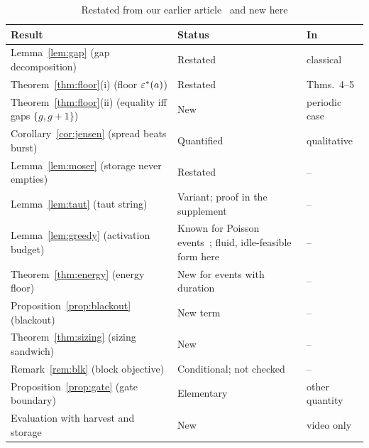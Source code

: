 \begin{table}[!t]\centering
\caption{Restated from our earlier article~\cite{deep3_jiot2026} and new here}\label{tab:new}
\footnotesize\setlength{\tabcolsep}{3pt}
\begin{tabular}{@{}>{\raggedright\arraybackslash}p{}>{\raggedright\arraybackslash}p{}>{\raggedright\arraybackslash}p{}@{}}\toprule
Result & Status & In~\cite{deep3_jiot2026}\\\midrule
Lemma~\ref{lem:gap} (gap decomposition) & Restated & classical\\
Theorem~\ref{thm:floor}(i) (floor $\varepsilon^*(a)$) & Restated & Thms.~4--5\\
Theorem~\ref{thm:floor}(ii) (equality iff gaps $\{g,g+1\}$) & New & periodic case\\
Corollary~\ref{cor:jensen} (spread beats burst) & Quantified & qualitative\\
Lemma~\ref{lem:moser} (storage never empties) & Restated & --\\
Lemma~\ref{lem:taut} (taut string) & Variant; proof in the supplement & --\\
Lemma~\ref{lem:greedy} (activation budget) & Known for Poisson events~\cite{ren2015p2p}; fluid, idle-feasible form here & --\\
Theorem~\ref{thm:energy} (energy floor) & New for events with duration & --\\
Proposition~\ref{prop:blackout} (blackout) & New term & --\\
Theorem~\ref{thm:sizing} (sizing sandwich) & New & --\\
Remark~\ref{rem:blk} (block objective) & Conditional; not checked & --\\
Proposition~\ref{prop:gate} (gate boundary) & Elementary & other quantity\\
Evaluation with harvest and storage & New & video only\\\bottomrule
\end{tabular}
\end{table}
